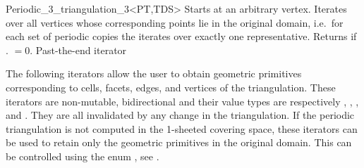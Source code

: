 \begin{ccRefClass}{Periodic_3_triangulation_3<PT,TDS>}
{Starts at an arbitrary vertex. Iterates over all vertices whose
  corresponding points lie in the original domain, i.e.\ for each set
  of periodic copies the  iterates over
  exactly one representative. Returns  if
  \ccVar. $=0$.}
\ccGlue
{}
{Past-the-end iterator}

The following iterators allow the user to obtain geometric primitives
corresponding to cells, facets, edges, and vertices of the
triangulation.
These iterators are non-mutable, bidirectional and their value types
are respectively , ,
, and . They are all
invalidated by any change in the triangulation. If the periodic
triangulation is not computed in the 1-sheeted covering space, these iterators
can be used to retain only the geometric primitives in the original
domain. This can be controlled using the enum , see
. 


\end{ccRefClass}
